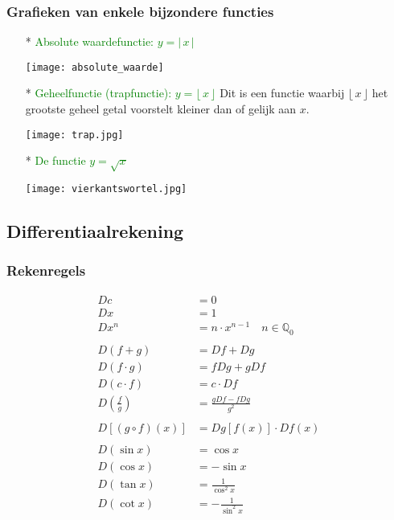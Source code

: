 \hypertarget{bijzondere_functies}{}
\subsubsection{Grafieken van enkele bijzondere functies} \label{bijzondere_functies}

\begin{itemize}
\item[*] \textcolor{green}{\hypertarget{absolute_waardefunctie}{Absolute waardefunctie: $y=|\,x\,|$}} \label{absolute_waardefunctie}
  \begin{center}
  \texttt{[image: absolute\_waarde]}
  \end{center}
\item[*] \textcolor{green}{Geheelfunctie (\hypertarget{trapfunctie}{trapfunctie}): $y=\lfloor\,x\,\rfloor$} \label{trapfunctie}\newline
  Dit is een functie waarbij $\lfloor\,x\,\rfloor$ het grootste geheel getal voorstelt kleiner dan of gelijk aan $x$.
  \begin{center}
  \texttt{[image: trap.jpg]}
  \end{center}
\item[*] \textcolor{green}{De functie \hypertarget{vierkantswortel}{$y=\sqrt{x}$}} \label{vierkantswortel}
  \begin{center}
  \texttt{[image: vierkantswortel.jpg]}
  \end{center}
\end{itemize}

\subsection{Differentiaalrekening}

\subsubsection{Rekenregels} \label{rekenregels_afgeleiden}

\begin{align*}
  Dc &= 0\\
  Dx &= 1\\
  Dx^n &= n\cdot x^{n-1}\quad n\in \mathbb{Q}_0\\
  \\
  D(f+g) &= Df + Dg\\
  D(f\cdot g) &= fDg + gDf\\
  D(c\cdot f) &= c\cdot Df\\
  D\left(\frac{f}{g}\right) &= \frac{gDf-fDg}{g^2}\\
  \\
  D\left[\left(g\circ f\right)(x)\right] &= Dg\left[f(x)\right]\cdot Df(x)\\
  \\
  D(\sin x) &= \cos x\\
  D(\cos x) &= -\sin x\\
  D(\tan x) &= \frac{1}{\cos^2 x}\\
  D(\cot x) &= -\frac{1}{\sin^2 x}\\
\end{align*}


